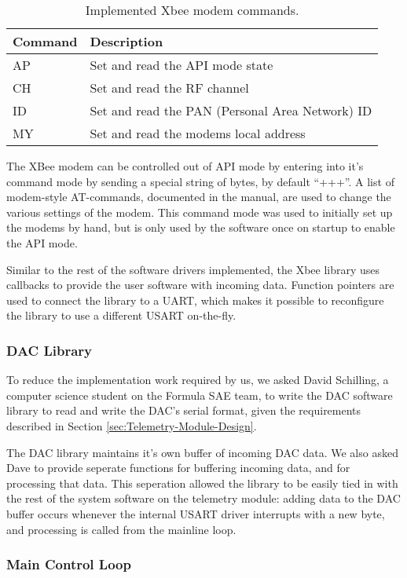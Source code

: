 \begin{table}
\caption{Implemented Xbee modem commands.\label{tab:xbee_commands}}
\centering{}
\begin{tabular}{|l|l|}
\hline 
Command & Description \tabularnewline
\hline
\hline
AP & Set and read the API mode state \tabularnewline
\hline
CH & Set and read the RF channel \tabularnewline
\hline 
ID & Set and read the PAN (Personal Area Network) ID \tabularnewline
\hline
MY & Set and read the modems local address \tabularnewline
\hline
\end{tabular}
\end{table}

The XBee modem can be controlled out of API mode by entering into it's command mode by sending a special string of bytes, by default ``+++''. A list of modem-style AT-commands, documented in the manual, are used to change the various settings of the modem. This command mode was used to initially set up the modems by hand, but is only used by the software once on startup to enable the API mode.

Similar to the rest of the software drivers implemented, the Xbee library uses callbacks to provide the user software with incoming data. Function pointers are used to connect the library to a UART, which makes it possible to reconfigure the library to use a different USART on-the-fly.

\subsubsection{DAC Library}

To reduce the implementation work required by us, we asked David Schilling, a computer science student on the Formula SAE team, to write the DAC software library to read and write the DAC's serial format, given the requirements described in Section \ref{sec:Telemetry-Module-Design}.

The DAC library maintains it's own buffer of incoming DAC data. We also asked Dave to provide seperate functions for buffering incoming data, and for processing that data. This seperation allowed the library to be easily tied in with the rest of the system software on the telemetry module: adding data to the DAC buffer occurs whenever the internal USART driver interrupts with a new byte, and processing is called from the mainline loop.

\subsubsection{Main Control Loop}

